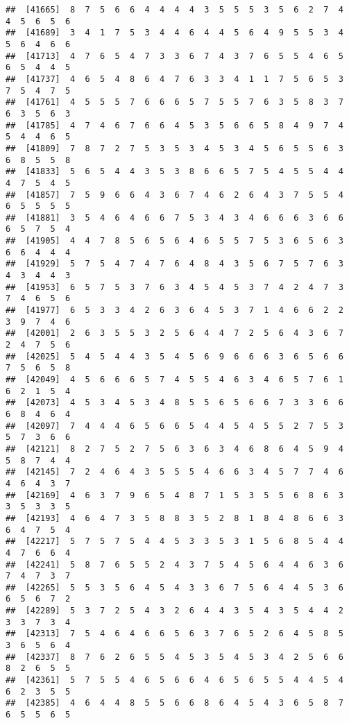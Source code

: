 \documentclass[
]{book}
\begin{document}
\begin{verbatim}
##  [41665]  8  7  5  6  6  4  4  4  4  3  5  5  5  3  5  6  2  7  4  4  5  6  5  6
##  [41689]  3  4  1  7  5  3  4  4  6  4  4  5  6  4  9  5  5  3  4  5  6  4  6  6
##  [41713]  4  7  6  5  4  7  3  3  6  7  4  3  7  6  5  5  4  6  5  6  5  4  4  5
##  [41737]  4  6  5  4  8  6  4  7  6  3  3  4  1  1  7  5  6  5  3  7  5  4  7  5
##  [41761]  4  5  5  5  7  6  6  6  5  7  5  5  7  6  3  5  8  3  7  6  3  5  6  3
##  [41785]  4  7  4  6  7  6  6  4  5  3  5  6  6  5  8  4  9  7  4  5  4  4  6  5
##  [41809]  7  8  7  2  7  5  3  5  3  4  5  3  4  5  6  5  5  6  3  6  8  5  5  8
##  [41833]  5  6  5  4  4  3  5  3  8  6  6  5  7  5  4  5  5  4  4  4  7  5  4  5
##  [41857]  7  5  9  6  6  4  3  6  7  4  6  2  6  4  3  7  5  5  4  6  5  5  5  5
##  [41881]  3  5  4  6  4  6  6  7  5  3  4  3  4  6  6  6  3  6  6  6  5  7  5  4
##  [41905]  4  4  7  8  5  6  5  6  4  6  5  5  7  5  3  6  5  6  3  6  6  4  4  4
##  [41929]  5  7  5  4  7  4  7  6  4  8  4  3  5  6  7  5  7  6  3  4  3  4  4  3
##  [41953]  6  5  7  5  3  7  6  3  4  5  4  5  3  7  4  2  4  7  3  7  4  6  5  6
##  [41977]  6  5  3  3  4  2  6  3  6  4  5  3  7  1  4  6  6  2  2  3  9  7  4  6
##  [42001]  2  6  3  5  5  3  2  5  6  4  4  7  2  5  6  4  3  6  7  2  4  7  5  6
##  [42025]  5  4  5  4  4  3  5  4  5  6  9  6  6  6  3  6  5  6  6  7  5  6  5  8
##  [42049]  4  5  6  6  6  5  7  4  5  5  4  6  3  4  6  5  7  6  1  6  2  1  5  4
##  [42073]  4  5  3  4  5  3  4  8  5  5  6  5  6  6  7  3  3  6  6  6  8  4  6  4
##  [42097]  7  4  4  4  6  5  6  6  5  4  4  5  4  5  5  2  7  5  3  5  7  3  6  6
##  [42121]  8  2  7  5  2  7  5  6  3  6  3  4  6  8  6  4  5  9  4  5  8  7  4  4
##  [42145]  7  2  4  6  4  3  5  5  5  4  6  6  3  4  5  7  7  4  6  4  6  4  3  7
##  [42169]  4  6  3  7  9  6  5  4  8  7  1  5  3  5  5  6  8  6  3  3  5  3  3  5
##  [42193]  4  6  4  7  3  5  8  8  3  5  2  8  1  8  4  8  6  6  3  6  4  7  5  4
##  [42217]  5  7  5  7  5  4  4  5  3  3  5  3  1  5  6  8  5  4  4  4  7  6  6  4
##  [42241]  5  8  7  6  5  5  2  4  3  7  5  4  5  6  4  4  6  3  6  7  4  7  3  7
##  [42265]  5  5  3  5  6  4  5  4  3  3  6  7  5  6  4  4  5  3  6  6  5  6  7  2
##  [42289]  5  3  7  2  5  4  3  2  6  4  4  3  5  4  3  5  4  4  2  3  3  7  3  4
##  [42313]  7  5  4  6  4  6  6  5  6  3  7  6  5  2  6  4  5  8  5  3  6  5  6  4
##  [42337]  8  7  6  2  6  5  5  4  5  3  5  4  5  3  4  2  5  6  6  8  2  6  5  5
##  [42361]  5  7  5  5  4  6  5  6  6  4  6  5  6  5  5  4  4  5  4  6  2  3  5  5
##  [42385]  4  6  4  4  8  5  5  6  6  8  6  4  5  4  3  6  5  8  7  6  5  5  6  5

\end{verbatim}
\end{document}
